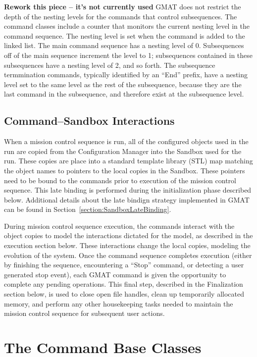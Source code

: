 \textbf{Rework this piece -- it's not currently used} GMAT does not restrict the depth of the
nesting levels for the commands that control subsequences. The command classes include a counter
that monitors the current nesting level in the command sequence.  The nesting level is set when the
command is added to the linked list.  The main command sequence has a nesting level of 0.
Subsequences off of the main sequence increment the level to 1; subsequences contained in these
subsequences have a nesting level of 2, and so forth.  The subsequence termmination commands,
typically identified by an ``End'' prefix, have a nesting level set to the same level as the rest of
the subsequence, because they are the last command in the subsequence, and therefore exist at the
subsequence level.

\subsection{Command--Sandbox Interactions}

When a mission control sequence is run, all of the configured objects used in the run are copied
from the Configuration Manager into the Sandbox used for the run.  These copies are place into a
standard template library (STL) map matching the object names to pointers to the local copies in
the Sandbox.  These pointers need to be bound to the commands prior to execution of the mission
control sequence.  This late binding is performed during the initialization phase described below.
Additional details about the late bindign strategy implemented in GMAT can be found in
Section~\ref{section:SandboxLateBinding}.

During mission control sequence execution, the commands interact with the object copies to model
the interactions dictated for the model, as described in the execution section below.  These
interactions change the local copies, modeling the evolution of the system.  Once the command
sequence completes execution (either by finishing the sequence, encountering a ``Stop'' command, or
detecting a user generated stop event), each GMAT command is given the opportunity to complete any
pending operations.  This final step, described in the Finalization section below, is used to close
open file handles, clean up temporarily allocated memory, and perform any other housekeeping tasks
needed to maintain the mission control sequence for subsequent user actions.

\section{The Command Base Classes}

